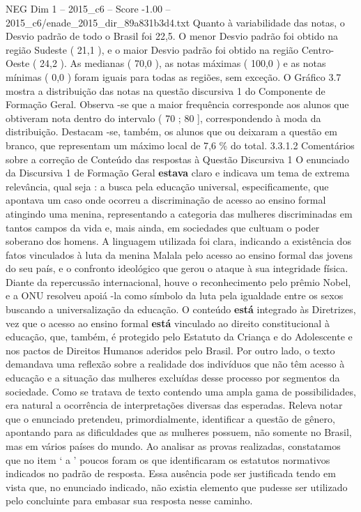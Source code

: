\begin{textsample}{NEG Dim 1 – 2015\_c6 – Score -1.00 – 2015\_c6/enade\_2015\_dir\_89a831b3d4.txt}
Quanto à variabilidade das notas, o Desvio padrão de todo o Brasil foi 22,5.
O menor Desvio padrão foi obtido na região Sudeste ( 21,1 ), e o maior Desvio padrão foi obtido na região Centro-Oeste ( 24,2 ).
As medianas ( 70,0 ), as notas máximas ( 100,0 ) e as notas mínimas ( 0,0 ) foram iguais para todas as regiões, sem exceção.
O Gráfico 3.7 mostra a distribuição das notas na questão discursiva 1 do Componente de Formação Geral.
Observa -se que a maior frequência corresponde aos alunos que obtiveram nota dentro do intervalo ( 70 ; 80 ], correspondendo à moda da distribuição.
Destacam -se, também, os alunos que ou deixaram a questão em branco, que representam um máximo local de 7,6 \% do total. 3.3.1.2 Comentários sobre a correção de Conteúdo das respostas à Questão Discursiva 1 O enunciado da Discursiva 1 de Formação Geral \textbf{estava} claro e indicava um tema de extrema relevância, qual seja : a busca pela educação universal, especificamente, que apontava um caso onde ocorreu a discriminação de acesso ao ensino formal atingindo uma menina, representando a categoria das mulheres discriminadas em tantos campos da vida e, mais ainda, em sociedades que cultuam o poder soberano dos homens.
A linguagem utilizada foi clara, indicando a existência dos fatos vinculados à luta da menina Malala pelo acesso ao ensino formal das jovens do seu país, e o confronto ideológico que gerou o ataque à sua integridade física.
Diante da repercussão internacional, houve o reconhecimento pelo prêmio Nobel, e a ONU resolveu apoiá -la como símbolo da luta pela igualdade entre os sexos buscando a universalização da educação.
O conteúdo \textbf{está} integrado às Diretrizes, vez que o acesso ao ensino formal \textbf{está} vinculado ao direito constitucional à educação, que, também, é protegido pelo Estatuto da Criança e do Adolescente e nos pactos de Direitos Humanos aderidos pelo Brasil.
Por outro lado, o texto demandava uma reflexão sobre a realidade dos indivíduos que não têm acesso à educação e a situação das mulheres excluídas desse processo por segmentos da sociedade.
Como se tratava de texto contendo uma ampla gama de possibilidades, era natural a ocorrência de interpretações diversas das esperadas.
Releva notar que o enunciado pretendeu, primordialmente, identificar a questão de gênero, apontando para as dificuldades que as mulheres possuem, não somente no Brasil, mas em vários países do mundo.
Ao analisar as provas realizadas, constatamos que no item ‘ a ’ poucos foram os que identificaram os estatutos normativos indicados no padrão de resposta.
Essa ausência pode ser justificada tendo em vista que, no enunciado indicado, não existia elemento que pudesse ser utilizado pelo concluinte para embasar sua resposta nesse caminho.

\end{textsample}
